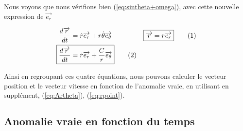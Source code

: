 \documentclass{report}
\begin{document}
Nous voyons que nous vérifions bien (\ref{eq:sintheta+omega}), avec cette nouvelle expression de $\overrightarrow{e_r}$

\begin{align*}
\frac{d\overrightarrow r}{dt}&=\dot r\overrightarrow{e_r}+r\dot\theta\overrightarrow{e_\theta}&
\Aboxed{\overrightarrow r&=r\overrightarrow{e_r}}\stepcounter{equation}\tag{\theequation}\label{eq:rtheta}\\
\Aboxed{\frac{d\overrightarrow r}{dt}&=\dot r\overrightarrow{e_r}+\frac{C}{r}\overrightarrow{e_\theta}}
\stepcounter{equation}\tag{\theequation}\label{eq:rpointtheta}\\
\end{align*}

Ainsi en regroupant ces quatre équations, nous pouvons calculer le vecteur position et le vecteur vitesse en fonction de l'anomalie vraie, en utilisant en supplément, (\ref{eq:Artheta}), (\ref{eq:rpoint}).

\subsection{Anomalie vraie en fonction du temps}
\end{document}
